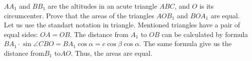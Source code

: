\problem
$A A_1$ and $B B_1$ are the altitudes in an acute triangle $ABC$, and $O$ is
its circumcenter.
Prove that the areas of the triangles $A O B_1$ and $B O A_1$ are equal.
\solution
Let us use the standart notation in triangle. Mentioned triangles have a pair of equal sides: $OA = OB$. The distance from $A_1$ to $OB$ can be calculated by formula
\(
    B A_1 \cdot \sin \angle CBO
=
    B A_1 \cos \alpha
=
    c \cos \beta \cos\alpha
\).
The same formula give us the distance from$B_1$ to$AO$. Thus, the areas are equal.
\endproblem
